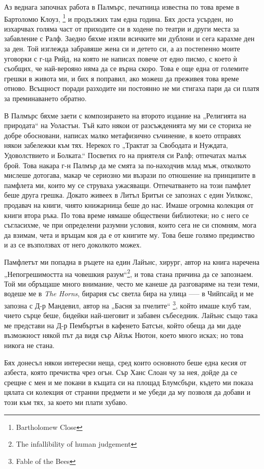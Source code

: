 \documentclass[12pt]{book}
\begin{document}
Аз веднага започнах работа в Палмърс, печатница известна по това време в Бартоломю Клоуз, \footnote{Bartholomew Close} и продължих там една година. Бях доста усърден, но изхарчвах голяма част от приходите си в ходене по театри и други места за забавление с Ралф. Заедно бяхме изяли всичките ми дублони и сега карахме ден за ден. Той изглежда забравяше жена си и детето си, а аз постепенно моите уговорки с г-ца Рийд, на която не написах повече от едно писмо, с което ѝ съобщих, че най-верояно няма да се върна скоро. Това е още една от големите грешки в живота ми, и бих я поправил, ако можеш да преживея това време отново. Всъщност поради разходите ни постоянно не ми стигаха пари да си платя за преминаването обратно.

В Палмърс бяхме заети с композирането на второто издание на „Религията на природата“ на Уоластън. Тъй като някои от разсъжденията му ми се сториха не добре обосновани, написах малко метафизично съчинение, в което отправях някои забележки към тях. Нерекох го „Трактат за Свободата и Нуждата, Удоволствието и Болката.“ Посветих го на приятеля си Ралф; отпечатах малък брой. Това накара г-н Палмър да ме смята за по-находчив млад мъж, отколкото мислеше дотогава, макар че сериозно ми възрази по отношение на принципите в памфлета ми, които му се струваха ужасяващи. Отпечатването на този памфлет беше друга грешка. Докато живеех в Литъл Бритън се запознах с един Уилкокс, продавач на книги, чиято книжарница беше до нас. Имаше огромна колекция от книги втора ръка. По това време нямаше обществени библиотеки; но с него се съгласихме, че при определени разумни условия, които сега не си спомням, мога да взимам, чета и връщам коя да е от книгите му. Това беше голямо предимство и аз се възползвах от него доколкото можех. 

Памфлетът ми попадна в ръцете на един Лайънс, хирург, автор на книга наречена „Непогрешимостта на човешкия разум“\footnote{The infallibility of human judgement}, и това стана причина да се запознаем. Той ми обръщаше много внимание, често ме канеше да разговаряме на тези теми, водеше ме в \textit{The Horns}, бирария със светла бира на улица ----- в Чийпсайд и ме запозна с Д-р Мандевил, автор на „Басня за пчелите“ \footnote{Fable of the Bees}, който имаше клуб там, чието сърце беше, бидейки най-шеговит и забавен събеседник. Лайънс също така ме представи на Д-р Пембъртън в кафенето Батсън, който обеща да ми даде възможност някой път да видя сър Айзък Нютон, което много исках; но това никога не стана.

Бях донесъл някои интересни неща, сред които основното беше една кесия от азбеста, която пречиства чрез огън. Сър Ханс Слоан чу за нея, дойде да се срещне с мен и ме покани в къщата си на площад Блумсбъри, където ми показа цялата си колекция от странни предмети и ме убеди да му позволя да добави и този към тях, за което ми плати хубаво. 
\end{document}
